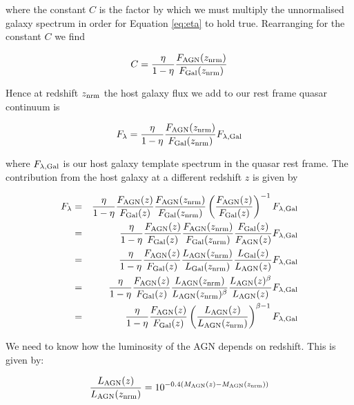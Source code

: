 where the constant $C$ is the factor by which we must multiply the unnormalised galaxy spectrum in order for Equation \ref{eq:eta} to hold true. Rearranging for the constant $C$ we find

\begin{eqnarray}
  C = \frac{\eta}{1 - \eta} \frac{F_{\rm AGN}(z_{\rm nrm})}{F_{\rm Gal}(z_{\rm nrm})}
\end{eqnarray}
 
Hence at redshift $z_{\rm nrm}$ the host galaxy flux we add to our rest frame quasar continuum is 

\begin{eqnarray}
  \label{eq:flambda}
  F_{\lambda} = \frac{\eta}{1 - \eta} \frac{F_{\rm AGN}(z_{\rm nrm})}{F_{\rm Gal}(z_{\rm nrm})} F_{\lambda,{\rm Gal}}
\end{eqnarray}

where $F_{\lambda,{\rm Gal}}$ is our host galaxy template spectrum in the quasar rest frame. The contribution from the host galaxy at a different redshift $z$ is given by  

\begin{eqnarray}
  F_{\lambda} & = & \frac{\eta}{1 - \eta} \frac{F_{\rm AGN}(z)}{F_{\rm Gal}(z)} \frac{F_{\rm AGN}(z_{\rm nrm})}{F_{\rm Gal}(z_{\rm nrm})} \left( \frac{F_{\rm AGN}(z)}{F_{\rm Gal}(z)} \right)^{-1}  F_{\lambda,{\rm Gal}} \\ 
& = &  \frac{\eta}{1 - \eta} \frac{F_{\rm AGN}(z)}{F_{\rm Gal}(z)} \frac{F_{\rm AGN}(z_{\rm nrm})}{F_{\rm Gal}(z_{\rm nrm})}  \frac{F_{\rm Gal}(z)}{F_{\rm AGN}(z)}   F_{\lambda,{\rm Gal}} \\ & = &  \frac{\eta}{1 - \eta} \frac{F_{\rm AGN}(z)}{F_{\rm Gal}(z)} \frac{L_{\rm AGN}(z_{\rm nrm})}{L_{\rm Gal}(z_{\rm nrm})}  \frac{L_{\rm Gal}(z)}{L_{\rm AGN}(z)}  F_{\lambda,{\rm Gal}}  \\ & = & \frac{\eta}{1 - \eta} \frac{F_{\rm AGN}(z)}{F_{\rm Gal}(z)} \frac{L_{\rm AGN}(z_{\rm nrm})}{L_{\rm AGN}(z_{\rm nrm})^\beta}  \frac{L_{\rm AGN}(z)^\beta}{L_{\rm AGN}(z)}  F_{\lambda,{\rm Gal}} \\ & = &  \frac{\eta}{1 - \eta} \frac{F_{\rm AGN}(z)}{F_{\rm Gal}(z)} \left( \frac{L_{\rm AGN}(z)}{L_{\rm AGN}(z_{\rm nrm})} \right)^{\beta - 1}  F_{\lambda,{\rm Gal}}
\end{eqnarray}

We need to know how the luminosity of the AGN depends on redshift. This is given by:

\begin{eqnarray}
  \frac{L_{\rm AGN}(z)}{L_{\rm AGN}(z_{\rm nrm})} = 10^{-0.4(M_{\rm AGN}(z)-M_{\rm AGN}(z_{\rm nrm}))}
\end{eqnarray}

